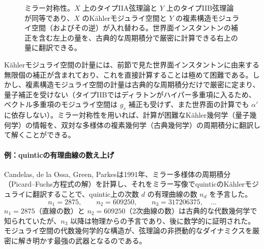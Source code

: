 \documentclass[uplatex, dvipdfmx, book]{jsbook}
\begin{document}
\begin{figure}[htbp]
\centering
{}
\caption{ミラー対称性。$X$ 上のタイプIIA弦理論と $Y$ 上のタイプIIB弦理論が同等であり、$X$ のK\"ahlerモジュライ空間と $Y$ の複素構造モジュライ空間（およびその逆）が入れ替わる。世界面インスタントンの補正を含む左上の量を、古典的な周期積分で厳密に計算できる右上の量に翻訳できる。}
\label{fig:mirror}
\end{figure}

K\"ahlerモジュライ空間の計量には、前節で見た世界面インスタントンに由来する無限個の補正が含まれており、これを直接計算することは極めて困難である。しかし、複素構造モジュライ空間の計量は古典的な周期積分だけで厳密に定まり、量子補正を受けない（タイプIIBではディラトンがハイパー多重項に入るため、ベクトル多重項のモジュライ空間は $g_s$ 補正も受けず、また世界面の計算でも $\alpha'$ に依存しない）。ミラー対称性を用いれば、計算が困難なK\"ahler幾何学（量子幾何学）の情報を、双対な多様体の複素幾何学（古典幾何学）の周期積分に翻訳して解くことができる。

\paragraph{例：quinticの有理曲線の数え上げ}
Candelas, de la Ossa, Green, Parkesは1991年\cite{candelas1991}、ミラー多様体の周期積分（Picard--Fuchs方程式の解）を計算し、それをミラー写像でquinticのK\"ahlerモジュライに翻訳することで、quintic上の次数 $d$ の有理曲線の数 $n_d$ を予言した。
\begin{equation}
    n_1 = 2875, \qquad n_2 = 609250, \qquad n_3 = 317206375, \quad \dots
\end{equation}
$n_1 = 2875$（直線の数）と $n_2 = 609250$（2次曲線の数）は古典的な代数幾何学で知られていたが、$n_3$ 以降は物理からの予言であり、後に数学的に証明された。モジュライ空間の代数幾何学的な構造が、弦理論の非摂動的なダイナミクスを厳密に解き明かす最強の武器となるのである。
\end{document}
